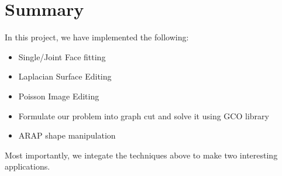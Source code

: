\section{Summary}
In this project, we have implemented the following:
\begin{itemize}
\item Single/Joint Face fitting \cite{yang2011expression}
\item Laplacian Surface Editing \cite{sorkine2004laplacian}
\item Poisson Image Editing \cite{perez2003poisson}
\item Formulate our problem into graph cut\cite{yang2011expression} and solve it using GCO library \cite{boykov2004experimental}
\item ARAP shape manipulation \cite{igarashi2005rigid}
\end{itemize}
Most importantly, we integate the techniques above to make two interesting applications.
 

    